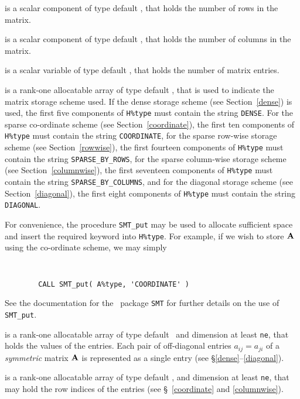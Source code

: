 \documentclass{galahad}
\begin{document}
\begin{description}

 is a scalar component of type default \integer, 
that holds the number of rows in the matrix. 
 
 is a scalar component of type default \integer, 
that holds the number of columns in the matrix. 
 
 is a scalar variable of type default \integer, that
holds the number of matrix entries.

 is a rank-one allocatable array of type default \character, that
is used to indicate the matrix storage scheme used.  If the dense storage scheme 
(see Section~\ref{dense}) is used, 
the first five components of {\tt H\%type} must contain the
string {\tt DENSE}.
For the sparse co-ordinate scheme (see Section~\ref{coordinate}), 
the first ten components of {\tt H\%type} must contain the
string {\tt COORDINATE},  
for the sparse row-wise storage scheme (see Section~\ref{rowwise}),
the first fourteen components of {\tt H\%type} must contain the
string {\tt SPARSE\_BY\_ROWS},
for the sparse column-wise storage scheme (see Section~\ref{columnwise}),
the first seventeen components of {\tt H\%type} must contain the
string {\tt SPARSE\_BY\_COLUMNS},
and for the diagonal storage scheme (see Section~\ref{diagonal}),
the first eight components of {\tt H\%type} must contain the
string {\tt DIAGONAL}.

For convenience, the procedure {\tt SMT\_put} 
may be used to allocate sufficient space and insert the required keyword
into {\tt H\%type}.
For example, if we wish to store ${\mathbf{A}}$ using the co-ordinate scheme,
we may simply
{\tt 
\begin{verbatim}
        CALL SMT_put( A%type, 'COORDINATE' )
\end{verbatim}
}
\noindent
See the documentation for the \galahad\ package {\tt SMT} 
for further details on the use of {\tt SMT\_put}. 

 is a rank-one allocatable array of type default \realdp\, 
and dimension at least {\tt ne}, that holds the values of the entries. 
Each pair of off-diagonal entries $a_{ij} = a_{ji}$ of a {\em symmetric}
matrix ${\mathbf{A}}$ is represented as a single entry 
(see \S\ref{dense}--\ref{diagonal}).

 is a rank-one allocatable array of type default \integer, 
and dimension at least {\tt ne}, that may hold the row indices of the entries 
(see \S~\ref{coordinate} and \ref{columnwise}).


\end{description}
\end{document}
